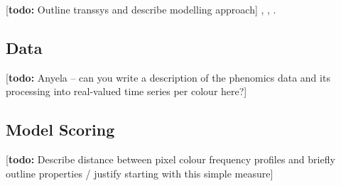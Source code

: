 \documentclass{frontiersSCNS} %
\newcommand{\todo}[1]{
  \rule{0pt}{0pt}\marginpar{{\color{blue}\rule{1ex}{1ex}}}
  {[\textbf{\color{blue}todo:} #1]}}
\begin{document}
\todo{Outline transsys and describe modelling approach} \cite{Kim2000},
\cite{Camargo2011_simgenex}, \cite{Camargo2012_dogenets}.


\subsection{Data}

\todo{Anyela -- can you write a description of the phenomics data and
  its processing into real-valued time series per colour here?}


\subsection{Model Scoring}

\todo{Describe distance between pixel colour frequency profiles and
  briefly outline properties / justify starting with this simple
  measure}



\end{document}
